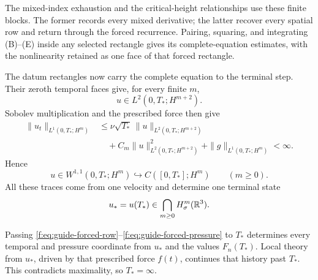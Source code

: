 The mixed-index exhaustion and the critical-height relationships use these
finite blocks.  The former records every mixed derivative; the
latter recover every spatial row and return through the forced recurrence.
Pairing, squaring, and integrating (B)--(E) inside any selected rectangle gives
its complete-equation estimates, with the nonlinearity retained as one face of
that forced rectangle.

\label{f:guide:finite-estimates}
The datum rectangles now carry the complete equation to the terminal
step.  Their zeroth temporal faces give, for every finite \(m\),
\[
 u\in L^2(0,T_*;H^{m+2}).
\]
Sobolev multiplication and the prescribed force then give
\begin{align*}
 \|u_t\|_{L^1(0,T_*;H^m)}
 &\le \nu\sqrt{T_*}\,\|u\|_{L^2(0,T_*;H^{m+2})}\\
 &\quad+C_m\|u\|_{L^2(0,T_*;H^{m+2})}^2
 +\|g\|_{L^1(0,T_*;H^m)}<\infty.
\end{align*}
Hence
\[
 u\in W^{1,1}(0,T_*;H^m)
 \hookrightarrow C([0,T_*];H^m)
 \qquad(m\ge0).
\]
All these traces come from one velocity and determine one
terminal state
\[
 u_*=u(T_*)\in\bigcap_{m\ge0}H^m_\sigma(\mathbb R^3).
\]

Passing \eqref{f:eq:guide-forced-row}--\eqref{f:eq:guide-forced-pressure} to
\(T_*\) determines every temporal and pressure coordinate from \(u_*\) and
the values \(F_n(T_*)\).  Local theory from \(u_*\), driven by that
prescribed force \(f(t)\), continues that history past \(T_*\).
This contradicts maximality, so \(T_*=\infty\).

\label{f:guide:how-proof-ends}
